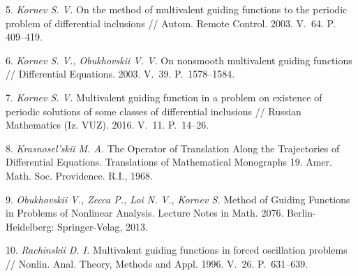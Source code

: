 5. {\it Kornev S. V.} On the method of multivalent guiding func\-tions to the periodic problem of differential inclusions // Autom. Remote Control. 2003. V.\, 64. P.\, 409--419.

6. {\it Kornev S. V., Obukhovskii V. V.} On nonsmooth multiva\-lent guiding functions // Differential Equations. 2003. V.\, 39. P.\, 1578--1584.

7. {\it Kornev S. V.} Multivalent guiding function in a problem on existence of periodic solutions of some classes of differential inclusions // Russian Mathematics (Iz. VUZ). 2016. V.\, 11. P.\, 14--26.

8. {\it Krasnosel'skii M. A.} The Operator of Translation Along the Trajectories of Differential Equations. Translations of Mathe\-matical Monographs 19. Amer. Math. Soc. Providence. R.I., 1968.

9. {\it Obukhovskii V., Zecca P., Loi N. V., Kornev S.}  Method of Guiding Functions in Problems of Nonlinear Analysis. Lecture Notes in Math. 2076. Berlin-Heidelberg: Springer-Velag, 2013.

10. {\it Rachinskii D. I.} Multivalent guiding functions in forced oscillation problems // Nonlin. Anal. Theory, Methods and Appl. 1996. V.\, 26. P.\, 631--639.
